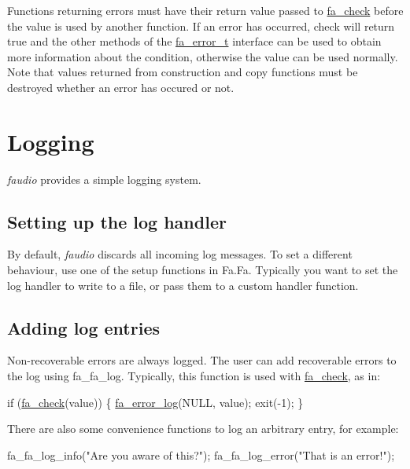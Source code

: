 Functions returning errors must have their return value passed to \hyperlink{group___fa_gaec61e23c174faf5e5244ae876d264eb5}{fa\-\_\-check} before the value is used by another function. If an error has occurred, check will return true and the other methods of the \hyperlink{group___fa_error_ga4a4feb4d3686657ac8dbd2be421cbb15}{fa\-\_\-error\-\_\-t} interface can be used to obtain more information about the condition, otherwise the value can be used normally. Note that values returned from construction and copy functions must be destroyed whether an error has occured or not.\hypertarget{md__error_handling_id24103}{}\section{Logging}\label{md__error_handling_id24103}
{\itshape faudio} provides a simple logging system.\hypertarget{md__error_handling_id30965}{}\subsection{Setting up the log handler}\label{md__error_handling_id30965}
By default, {\itshape faudio} discards all incoming log messages. To set a different behaviour, use one of the setup functions in Fa.Fa. Typically you want to set the log handler to write to a file, or pass them to a custom handler function.\hypertarget{md__error_handling_id10103}{}\subsection{Adding log entries}\label{md__error_handling_id10103}
Non-\/recoverable errors are always logged. The user can add recoverable errors to the log using fa\-\_\-fa\-\_\-log. Typically, this function is used with \hyperlink{group___fa_gaec61e23c174faf5e5244ae876d264eb5}{fa\-\_\-check}, as in\-:


\begin{DoxyCode}
\textcolor{keywordflow}{if} (\hyperlink{group___fa_gaec61e23c174faf5e5244ae876d264eb5}{fa\_check}(value)) \{
    \hyperlink{group___fa_error_ga466e0539bedb29f68527448ed9ba11bf}{fa\_error\_log}(NULL, value);
    exit(-1);
\}
\end{DoxyCode}


There are also some convenience functions to log an arbitrary entry, for example\-:


\begin{DoxyCode}
fa\_fa\_log\_info(\textcolor{stringliteral}{"Are you aware of this?"});
fa\_fa\_log\_error(\textcolor{stringliteral}{"That is an error!"});
\end{DoxyCode}
 